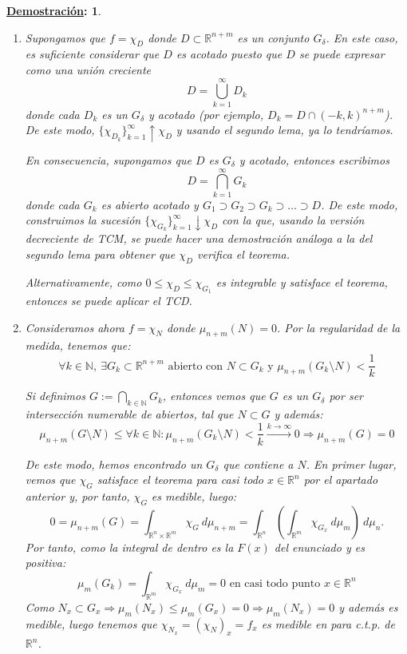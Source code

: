 \documentclass[10pt,a4paper,openright]{book}
\theoremstyle{break}
\newtheorem*{demo}{\underline{Demostración}:}
\newcommand{\dif}[1]{\ d#1}
\begin{document}
\begin{demo}
\begin{enumerate}
\item Supongamos que $f = \chi_D$ donde $D \subset \mathbb{R}^{n + m}$ es un conjunto $G_\delta$. En este caso, es suficiente considerar que $D$ es acotado puesto que $D$ se puede expresar como una unión creciente $$D = \bigcup_{k=1}^{\infty} D_k$$ donde cada $D_k$ es un $G_\delta$ y acotado (por ejemplo, $D_k = D \cap \left(-k, k\right)^{n+m}$). De este modo, $\{\chi_{D_k}\}_{k=1}^{\infty} \uparrow \chi_D$ y usando el segundo lema, ya lo tendríamos.

En consecuencia, supongamos que $D$ es $G_\delta $ y acotado, entonces escribimos
$$D = \bigcap_{k = 1}^{\infty} G_k$$
donde cada $G_k$ es abierto acotado y $G_1 \supset G_2 \supset G_k \supset \ldots \supset D$. De este modo, construimos la sucesión $\{\chi_{G_k}\}_{k=1}^{\infty} \downarrow \chi_D$ con la que, usando la versión decreciente de TCM, se puede hacer una demostración análoga a la del segundo lema para obtener que $\chi_D$ verifica el teorema. 

Alternativamente, como $0 \le \chi_D \le \chi_{G_1}$ es integrable y satisface el teorema, entonces se puede aplicar el TCD.

\item Consideramos ahora $f = \chi_N$ donde $\mu_{n+m} \left(N\right) = 0$. Por la regularidad de la medida, tenemos que:
$$\forall k \in \mathbb{N},\ \exists G_k \subset \mathbb{R}^{n+m} \mbox{ abierto con } N \subset G_k  \mbox{ y }  \mu_{n+m} \left(G_k \setminus N\right) < \frac{1}{k}$$

Si definimos $G:= \bigcap_{k \in \mathbb{N}} G_k$, entonces vemos que $G$ es un $G_\delta$ por ser intersección numerable de abiertos, tal que $N \subset G $ y además: 
$$\mu_{n+m} \left(G\setminus N\right) \le \forall k \in \mathbb{N}: \mu_{n+m} \left(G_k \setminus N\right) < \frac{1}{k} \xrightarrow{k\rightarrow \infty} 0 \Rightarrow \mu_{n+m}(G) = 0$$

De este modo, hemos encontrado un $G_\delta$ que contiene a $N$. En primer lugar, vemos que $\chi_G$ satisface el teorema para casi todo $x \in \mathbb{R}^n$ por el apartado anterior y, por tanto, $\chi_G$ es medible, luego:
$$0 = \mu_{n+m} \left(G\right) = \int_{\mathbb{R}^n \times \mathbb{R}^m} \chi_{G} \dif{\mu_{n+m}} = \int_{\mathbb{R}^n} \left( \int_{\mathbb{R}^m} \chi_{G_x}  \dif{\mu_m} \right) \dif{\mu_n}.$$
Por tanto, como la integral de dentro es la $F(x)$ del enunciado y es positiva:
$$\mu_m \left(G_k\right) = \int_{\mathbb{R}^m} \chi_{G_x} \dif{\mu_m} = 0 \text{ en casi todo punto } x \in \mathbb{R}^n$$
Como $N_x \subset G_x\Rightarrow \mu_m(N_x) \leq \mu_m(G_x) = 0 \Rightarrow \mu_m(N_x) = 0$ y además es medible, luego tenemos que $\chi_{N_x} = \left(\chi_N\right)_x = f_x$ es medible en para c.t.p. de $\mathbb{R}^n$.


\end{enumerate}
\end{demo}
\end{document}
